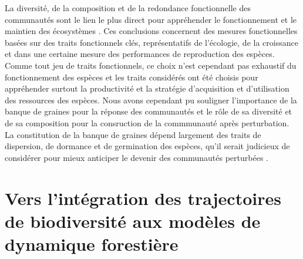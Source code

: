 \documentclass[
  11pt,
  french,
  A4paper,
  extrafontsizes,onecolumn,openright
  ]{memoir}
\begin{document}
La diversité, de la composition et de la redondance fonctionnelle des
communautés sont le lien le plus direct pour appréhender le
fonctionnement et le maintien des écosystèmes
\autocites{Violle2007b}{Kunstler2016}. Ces conclusions concernent des
mesures fonctionnelles basées sur des traits fonctionnels clés,
représentatifs de l'écologie, de la croissance et dans une certaine
mesure des performances de reproduction des espèces. Comme tout jeu de
traits fonctionnels, ce choix n'est cependant pas exhaustif du
fonctionnement des espèces et les traits considérés ont été choisis pour
appréhender surtout la productivité et la stratégie d'acquisition et
d'utilisation des ressources des espèces. Nous avons cependant pu
souligner l'importance de la banque de graines pour la réponse des
communautés et le rôle de sa diversité et de sa composition pour la
consruction de la commmunauté après perturbation. La constitution de la
banque de graines dépend largement des traits de dispersion, de dormance
et de germination des espèces, qu'il serait judicieux de considérer pour
mieux anticiper le devenir des communautés perturbées
\autocites{Verdu2005}{Schleuning2016}{Yguel_inprep}.

\section{Vers l'intégration des trajectoires de biodiversité aux modèles
de dynamique
forestière}\label{vers-lintegration-des-trajectoires-de-biodiversite-aux-modeles-de-dynamique-forestiere}
\end{document}

